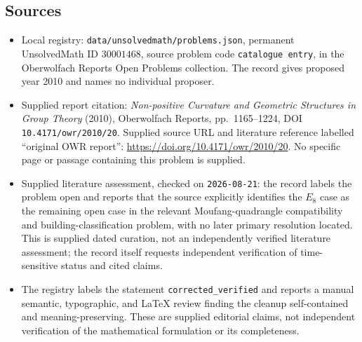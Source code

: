 \documentclass[11pt]{article}
\begin{document}
\subsection{Sources}
\begin{itemize}
\item Local registry: \texttt{data/unsolvedmath/problems.json}, permanent UnsolvedMath ID \(30001468\), source problem code \texttt{catalogue entry}, in the Oberwolfach Reports Open Problems collection. The record gives proposed year 2010 and names no individual proposer.
\item Supplied report citation: \emph{Non-positive Curvature and Geometric Structures in Group Theory} (2010), Oberwolfach Reports, pp.~1165--1224, DOI \texttt{10.4171/owr/2010/20}. Supplied source URL and literature reference labelled ``original OWR report'': \url{https://doi.org/10.4171/owr/2010/20}. No specific page or passage containing this problem is supplied.
\item Supplied literature assessment, checked on \texttt{2026-08-21}: the record labels the problem open and reports that the source explicitly identifies the \(E_8\) case as the remaining open case in the relevant Moufang-quadrangle compatibility and building-classification problem, with no later primary resolution located. This is supplied dated curation, not an independently verified literature assessment; the record itself requests independent verification of time-sensitive status and cited claims.
\item The registry labels the statement \texttt{corrected\_verified} and reports a manual semantic, typographic, and LaTeX review finding the cleanup self-contained and meaning-preserving. These are supplied editorial claims, not independent verification of the mathematical formulation or its completeness.
\end{itemize}
\end{document}

